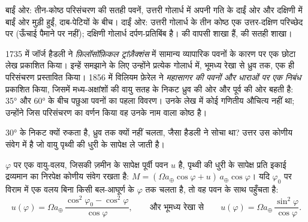 \begin{omfigure}
{\small बाईं ओर: तीन-कोष्ठ परिसंचरण की सतही पवनें, उत्तरी गोलार्ध में अपनी गति के दाईं ओर और दक्षिणी में बाईं ओर मुड़ी हुईं, दाब-पेटियों के बीच। दाईं ओर: उत्तरी गोलार्ध के तीन कोष्ठ एक उत्तर-दक्षिण परिच्छेद पर (ऊँचाई पैमाने पर नहीं); दक्षिणी गोलार्ध दर्पण-प्रतिबिंब है।   की वापसी शाखा हैं,   की सतही शाखा।}
\label{fig:b1:atmospheric-circulation:three-cells}
\end{omfigure}

\begin{history}[हैडली 1735, फ़ेरल 1856]
1735 में जॉर्ज हैडली ने \emph{फ़िलॉसॉफ़िकल ट्रांज़ैक्शंस} में सामान्य व्यापारिक पवनों के कारण पर एक छोटा लेख प्रकाशित किया। इन्हें समझाने के लिए उन्होंने प्रत्येक गोलार्ध में, भूमध्य रेखा से ध्रुव तक, एक ही परिसंचरण प्रस्तावित किया।
1856 में विलियम फ़ेरेल ने \emph{महासागर की पवनों और धाराओं पर एक निबंध} प्रकाशित किया, जिसमें मध्य-अक्षांशों की वायु सतह के निकट ध्रुव की ओर और पूर्व की ओर बहती है: \ang{35} और \ang{60} के बीच पछुआ पवनों का पहला विवरण। उनके लेख में कोई गणितीय औचित्य नहीं था; उन्होंने जिस परिसंचरण का वर्णन किया वह उनके नाम वाला कोष्ठ है।
\end{history}

 \ang{30} के निकट क्यों रुकता है, ध्रुव तक क्यों नहीं चलता, जैसा हैडली ने सोचा था? उत्तर उस कोणीय संवेग में है जो वायु पृथ्वी की धुरी के सापेक्ष ले जाती है।

\begin{proposition}[कोणीय-संवेग पवन]\label{prop:b1:atmospheric-circulation:angular-momentum}
 $\varphi$ पर एक वायु-वलय, जिसकी ज़मीन के सापेक्ष पूर्वी पवन $u$ है, पृथ्वी की धुरी के सापेक्ष प्रति इकाई द्रव्यमान का निरपेक्ष कोणीय संवेग
रखता है: $M =
(\Omega a_\oplus\cos\varphi + u)\,a_\oplus\cos\varphi$। यदि  $\varphi_0$ पर विराम में एक वलय बिना किसी बल-आघूर्ण के $\varphi$ तक चलता है, तो वह पवन के साथ पहुँचता है:
\[
  u(\varphi) = \Omega a_\oplus\,\frac{\cos^2\varphi_0 - \cos^2\varphi}{\cos\varphi},
  \qquad\text{और भूमध्य रेखा से}\qquad
  u(\varphi) = \Omega a_\oplus\,\frac{\sin^2\varphi}{\cos\varphi} .
\]
\end{proposition}

